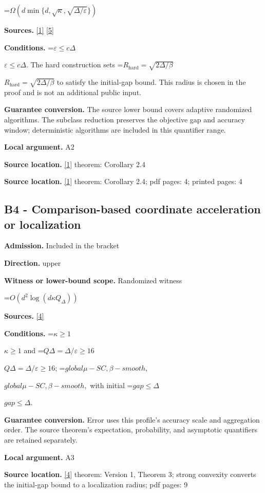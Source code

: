 \documentclass[10pt,a4paper]{article}
\newcommand{\AtlasMath}[1]{\par\begingroup\centering\setbox0=\hbox{$\displaystyle #1$}\ifdim\wd0>1.4\linewidth\typeout{ATLAS WIDE FORMULA: \the\wd0}\fi\ifdim\wd0>\linewidth\resizebox{\linewidth}{!}{\box0}\else\box0\fi\par\endgroup}
\newcommand{\AtlasInlineMath}[1]{\begingroup\setbox0=\hbox{$#1$}\ifdim\wd0>.4\linewidth\endgroup\AtlasMath{#1}\else\endgroup$#1$\fi}
\begin{document}
\AtlasMath{\Omega\!\left(d\min\{d,\sqrt\kappa,\sqrt{\Delta/\varepsilon}\}\right)}
\textbf{Sources.} \href{https://arxiv.org/html/2610.00345v1}{[1]} \href{https://arxiv.org/html/2610.19652v1}{[5]}

\textbf{Conditions.} \AtlasInlineMath{\varepsilon\le c\Delta}. The hard construction sets \AtlasInlineMath{R_{\mathrm{hard}}=\sqrt{2\Delta/\beta}} to satisfy the initial-gap bound. This radius is chosen in the proof and is not an additional public input.

\textbf{Guarantee conversion.} The source lower bound covers adaptive randomized algorithms. The subclass reduction preserves the objective gap and accuracy window; deterministic algorithms are included in this quantifier range.

\textbf{Local argument.} A2

\textbf{Source location.} \href{https://arxiv.org/html/2610.00345v1}{[1]} theorem: Corollary 2.4

\textbf{Source location.} \href{https://arxiv.org/html/2610.00345v1}{[1]} theorem: Corollary 2.4; pdf pages: 4; printed pages: 4

\subsection{B4 - Comparison-based coordinate acceleration or localization}
\textbf{Admission.} Included in the bracket

\textbf{Direction.} upper

\textbf{Witness or lower-bound scope.} Randomized witness

\AtlasMath{O(d^2\log(d\kappa Q_\Delta))}
\textbf{Sources.} \href{https://arxiv.org/html/2405.11454v1}{[4]}

\textbf{Conditions.} \AtlasInlineMath{\kappa \ge 1} and \AtlasInlineMath{Q\Delta =\Delta /\varepsilon \ge 16}; \AtlasInlineMath{global \mu -SC,\beta -smooth,} with initial \AtlasInlineMath{gap\le \Delta}.

\textbf{Guarantee conversion.} Error uses this profile's accuracy scale and aggregation order. The source theorem's expectation, probability, and asymptotic quantifiers are retained separately.

\textbf{Local argument.} A3

\textbf{Source location.} \href{https://arxiv.org/html/2405.11454v1}{[4]} theorem: Version 1, Theorem 3; strong convexity converts the initial-gap bound to a localization radius; pdf pages: 9
\end{document}
